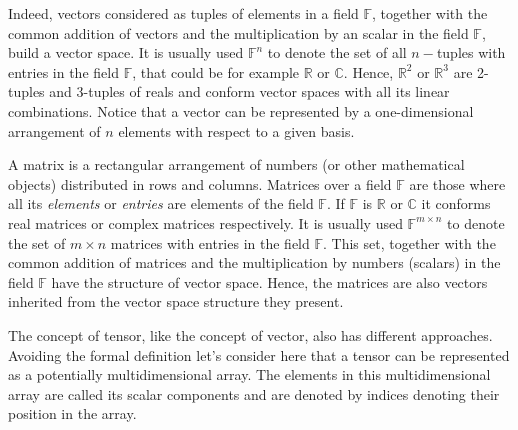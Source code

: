 Indeed, vectors considered as tuples of elements in a field $\mathbb{F}$, together with the common addition of vectors and the multiplication by an scalar in the field $\mathbb{F}$, build a vector space. 
It is usually used $\mathbb{F}^{n}$ to denote the set of all $n-$tuples with entries in the field $\mathbb{F}$, that could be for example $\mathbb{R}$ or $\mathbb{C}$. 
Hence, $\mathbb{R}^{2}$ or $\mathbb{R}^{3}$ are 2-tuples and 3-tuples of reals and conform vector spaces with all its linear combinations.
Notice that a vector can be represented by a one-dimensional arrangement of $n$ elements with respect to a given basis.

A matrix is a rectangular arrangement of numbers (or other mathematical objects) distributed in rows and columns.
Matrices over a field $\mathbb{F}$ are those where all its \textit{elements} or \textit{entries} are elements of the field $\mathbb{F}$.
If $\mathbb{F}$ is $\mathbb{R}$ or $\mathbb{C}$ it conforms real matrices or complex matrices respectively.
It is usually used $\mathbb{F}^{m\times n}$ to denote the set of $m\times n$ matrices with entries in the field $\mathbb{F}$. 
This set, together with the common addition of matrices and the multiplication by numbers (scalars) in the field $\mathbb{F}$ have the structure of vector space. 
Hence, the matrices are also vectors inherited from the vector space structure they present.

The concept of tensor, like the concept of vector, also has different approaches. 
Avoiding the formal definition let's consider here that a tensor can be represented as a potentially multidimensional array.
The elements in this multidimensional array are called its scalar components and are denoted by indices denoting their position in the array.


